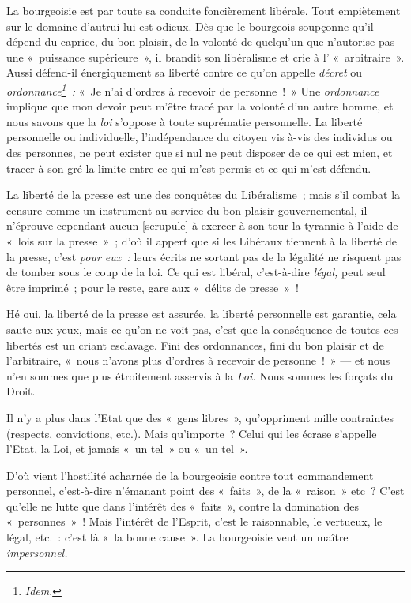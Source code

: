 \documentclass[french,twoside]{book} %
\newcommand\corr[1]{#1}
\begin{document}
La bourgeoisie est par toute sa conduite foncièrement libérale. Tout empiètement sur le domaine d’autrui lui est odieux. Dès que le bourgeois soupçonne qu’il dépend du caprice, du bon plaisir, de la volonté de quelqu’un que n’autorise pas une « puissance supérieure », il brandit son libéralisme et crie à l’ « arbitraire ». Aussi défend-il énergiquement sa liberté contre ce qu’on appelle \emph{décret} ou \emph{ordonnance\footnote{ \noindent \emph{Idem}.
 } :} « Je n’ai d’ordres à recevoir de personne ! » Une \emph{ordonnance} implique que mon devoir peut m’être tracé par la volonté d’un autre homme, et nous savons que la \emph{loi }s’oppose à toute suprématie personnelle. La liberté personnelle ou individuelle, l’indépendance du citoyen vis à-vis des individus ou des personnes, ne peut exister que si nul ne peut disposer de ce qui est mien, et tracer à son gré la limite entre ce qui m’est permis et ce qui m’est défendu.\par
La liberté de la presse est une des conquêtes du Libéralisme ; mais s’il combat la censure comme un instrument au service du bon plaisir gouvernemental, il n’éprouve cependant aucun [{\corr scrupule}] à exercer à son tour la tyrannie à l’aide de « lois sur la presse » ; d’où il appert que si les Libéraux tiennent à la liberté de la presse, c’est \emph{pour eux :} leurs écrits ne sortant pas de la légalité ne risquent pas de tomber sous le coup de la loi. Ce qui est libéral, c’est-à-dire \emph{légal, }peut seul être imprimé ; pour le reste, gare aux « délits de presse » !\par
Hé oui, la liberté de la presse est assurée, la liberté  personnelle est garantie, cela saute aux yeux, mais ce qu’on ne voit pas, c’est que la conséquence de toutes ces libertés est un criant esclavage. Fini des ordonnances, fini du bon plaisir et de l’arbitraire, « nous n’avons plus d’ordres à recevoir de personne ! » — et nous n’en sommes que plus étroitement asservis à la \emph{Loi.} Nous sommes les forçats du Droit.\par
Il n’y a plus dans l’Etat que des « gens libres », qu’oppriment mille contraintes (respects, convictions, etc.). Mais qu’importe ? Celui qui les écrase s’appelle l’Etat, la Loi, et jamais « un tel » ou « un tel ».\par
D’où vient l’hostilité acharnée de la bourgeoisie contre tout commandement personnel, c’est-à-dire n’émanant point des « faits », de la « raison » etc ? C’est qu’elle ne lutte que dans l’intérêt des « faits », contre la domination des « personnes » ! Mais l’intérêt de l’Esprit, c’est le raisonnable, le vertueux, le légal, etc. : c’est là « la bonne cause ». La bourgeoisie veut un maître \emph{impersonnel.}\par
\end{document}
